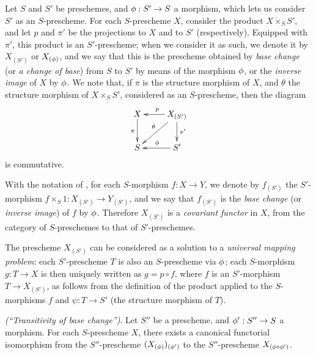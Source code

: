 \begin{env}[3.3.6]
\label{1.3.3.6}
Let $S$ and $S'$ be preschemes, and $\vphi:S'\to S$ a morphism, which lets us consider $S'$ as an
$S$-prescheme. For each $S$-prescheme $X$, consider the product $X\times_S S'$,
and let $p$ and $\pi'$ be the projections to $X$ and to $S'$ (respectively). Equipped
with $\pi'$, this product is an $S'$-prescheme; when we consider it as such, we
denote it by $X_{(S')}$ or $X_{(\phi)}$, and we say that this is the prescheme
obtained by \emph{base change} (or \emph{a change of base}) from $S$ to $S'$ by means of the morphism
$\phi$, or the \emph{inverse image} of $X$ by $\phi$. We note that, if $\pi$ is
the structure morphism of $X$, and $\theta$ the structure morphism of
$X\times_S S'$, considered as an $S$-prescheme, then the diagram
\[
  \xymatrix{
    X\ar[d]_\pi &
    X_{(S')}\ar[l]_p\ar[ld]_\theta\ar[d]^{\pi'}\\
    S &
    S'\ar[l]_\vphi
  }
\]
is commutative.
\end{env}

\begin{env}[3.3.7]
\label{1.3.3.7}
With the notation of , for each $S$-morphism $f:X\to Y$, we
denote by $f_{(S')}$ the $S'$-morphism $f\times_S 1:X_{(S')}\to Y_{(S')}$, and
we say that $f_{(S')}$ is the \emph{base change} (or \emph{inverse image}) of
$f$ by $\phi$. Therefore $X_{(S')}$ is a \emph{covariant functor} in $X$, from
the category of $S$-preschemes to that of $S'$-preschemes.
\end{env}

\begin{env}[3.3.8]
\label{1.3.3.8}
The prescheme $X_{(S')}$ can be considered as a solution to a \emph{universal
mapping problem}: each $S'$-prescheme $T$ is also an $S$-prescheme via $\phi$;
each $S$-morphism $g:T\to X$ is then uniquely written as $g=p\circ f$, where $f$
is an $S'$-morphism $T\to X_{(S')}$, as follows from the definition of the
product applied to the $S$-morphisms $f$ and $\psi:T\to S'$ (the structure
morphism of $T$).
\end{env}

\begin{proposition}[3.3.9]
\label{1.3.3.9}
\emph{(``Transitivity of base change'')}. Let $S''$ be a prescheme, and
$\vphi':S''\to S$ a morphism. For each $S$-prescheme $X$, there exists a
canonical functorial isomorphism from the $S''$-prescheme
$(X_{(\phi)})_{(\phi')}$ to the $S''$-prescheme $X_{(\phi\circ\phi')}$.
\end{proposition}

